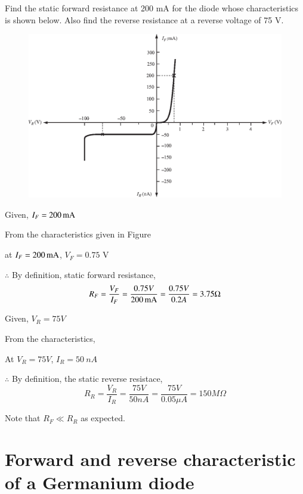 \begin{example}\label{exam1.2}
Find the static forward resistance at 200 mA for the diode whose
characteristics is shown below. Also find the reverse resistance at a
reverse voltage of 75 V.
\begin{figure}[H]
\centering
\includegraphics{chap1/S3-EE-01-008.eps}
\end{figure}
\end{example}

\begin{solution}
Given, $I_F = 200\operatorname{mA}$

From the characteristics given in Figure 

at $I_F = 200\operatorname{mA}$, $V_F =0.75$ V

$\therefore$ By definition, static forward resistance, 
$$
R_F = \frac{V_F}{I_F} = \frac{0.75 V}{200 \operatorname{mA}} = \frac{0.75 V}{0.2 A} =
3.75 \Omega
$$

Given, $V_R = 75 V$

From the characteristics, 

At $V_R =75V$, $I_R = 50~ nA$

$\therefore$ By definition, the static reverse resistace,
$$
R_R = \frac{V_R}{I_R} = \frac{75 V}{50 nA} = \frac{75 V}{0.05 \mu A} =
150 M \Omega
$$

Note that $R_F \ll R_R$ as expected.
\end{solution}


\section{Forward and reverse characteristic of a Germanium diode}\label{sec1.8}

